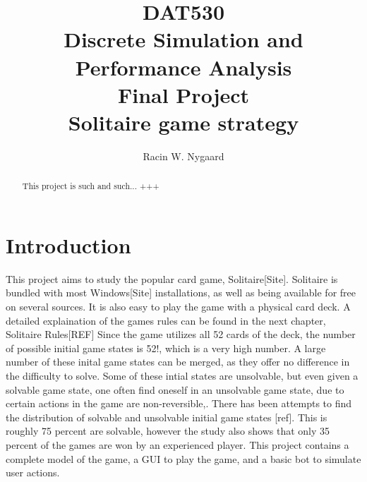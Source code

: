 \documentclass[runningheads,a4paper]{llncs}
\begin{document}
\mainmatter  %
\title{DAT530\\Discrete Simulation and Performance Analysis\\Final Project\\Solitaire game strategy}
\author{Racin W. Nygaard}

\tocauthor{ }
\maketitle
	


\begin{abstract}
This project is such and such... +++

\end{abstract}

\setcounter{tocdepth}{2}
\tableofcontents

\listoffigures
\listoftables
\printacronyms[name=Abbreviations]
\section{Introduction}
This project aims to study the popular card game, Solitaire[Site]. Solitaire is bundled with most Windows[Site] installations, as well as being available for free on several sources. It is also easy to play the game with a physical card deck. A detailed explaination of the games rules can be found in the next chapter, Solitaire Rules[REF]
\newline
Since the game utilizes all 52 cards of the deck, the number of possible initial game states is 52!, which is a very high number. A large number of these inital game states can be merged, as they offer no difference in the difficulty to solve. Some of these intial states are unsolvable, but even given a solvable game state, one often find oneself in an unsolvable game state, due to certain actions in the game are non-reversible,. There has been attempts to find the distribution of solvable and unsolvable initial game states [ref]. This is roughly 75 percent are solvable, however the study also shows that only 35 percent of the games are won by an experienced player.
\newline
This project contains a complete model of the game, a GUI to play the game, and a basic bot to simulate user actions. 
\end{document}

